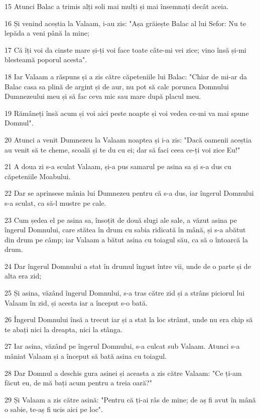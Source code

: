 \par 15 Atunci Balac a trimis alți soli mai mulți și mai însemnați decât aceia.
\par 16 Și venind aceștia la Valaam, i-au zis: "Așa grăiește Balac al lui Sefor: Nu te lepăda a veni până la mine;
\par 17 Că îți voi da cinste mare și-ți voi face toate câte-mi vei zice; vino însă și-mi blesteamă poporul acesta".
\par 18 Iar Valaam a răspuns și a zis către căpeteniile lui Balac: "Chiar de mi-ar da Balac casa sa plină de argint și de aur, nu pot să calc porunca Domnului Dumnezeului meu și să fac ceva mic sau mare după placul meu.
\par 19 Rămâneți însă acum și voi aici peste noapte și voi vedea ce-mi va mai spune Domnul".
\par 20 Atunci a venit Dumnezeu la Valaam noaptea și i-a zis: "Dacă oamenii aceștia au venit să te cheme, scoală și te du cu ei; dar să faci ceea ce-ți voi zice Eu!"
\par 21 A doua zi s-a sculat Valaam, și-a pus samarul pe asina sa și s-a dus cu căpeteniile Moabului.
\par 22 Dar se aprinsese mânia lui Dumnezeu pentru că s-a dus, iar îngerul Domnului s-a sculat, ca să-l mustre pe cale.
\par 23 Cum ședea el pe asina sa, însoțit de două slugi ale sale, a văzut asina pe îngerul Domnului, care stătea în drum cu sabia ridicată în mână, și s-a abătut din drum pe câmp; iar Valaam a bătut asina cu toiagul său, ca să o întoarcă la drum.
\par 24 Dar îngerul Domnului a stat în drumul îngust între vii, unde de o parte și de alta era zid;
\par 25 Și asina, văzând îngerul Domnului, s-a tras către zid și a strâns piciorul lui Valaam în zid, și acesta iar a început s-o bată.
\par 26 Îngerul Domnului însă a trecut iar și a stat la loc strâmt, unde nu era chip să te abați nici la dreapta, nici la stânga.
\par 27 Iar asina, văzând pe îngerul Domnului, s-a culcat sub Valaam. Atunci s-a mâniat Valaam și a început să bată asina cu toiagul.
\par 28 Dar Domnul a deschis gura asinei și aceasta a zis către Valaam: "Ce ți-am făcut eu, de mă bați acum pentru a treia oară?"
\par 29 Și Valaam a zis către asină: "Pentru că ți-ai râs de mine; de aș fi avut în mână o sabie, te-aș fi ucis aici pe loc".
